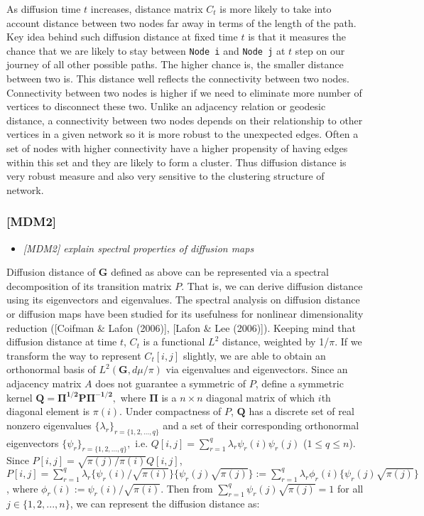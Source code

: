 \documentclass[12pt]{article}
\theoremstyle{definition}
\begin{document}
As diffusion time $t$ increases, distance matrix $C_{t}$ is more likely to take into account distance between two nodes far away in terms of the length of the path. Key idea behind such diffusion distance at fixed time $t$ is that it measures the chance that we are likely to stay between \texttt{Node i} and \texttt{Node j} at $t$ step on our journey of all other possible paths. The higher chance is, the smaller distance between two is. This distance well reflects the connectivity between two nodes. Connectivity between two nodes is higher if we need to eliminate more number of vertices to disconnect these two. Unlike an adjacency relation or geodesic distance, a connectivity between two nodes depends on their relationship to other vertices in a given network so it is more robust to the unexpected edges. Often a set of nodes with higher connectivity have a higher propensity of having edges within this set and they are likely to form a cluster. Thus diffusion distance is very robust measure and also very sensitive to the clustering structure of network. 



\subsubsection{[MDM2]}
\begin{itemize}
	\item {\it  [MDM2] explain spectral properties of diffusion maps \/}
\end{itemize}


Diffusion distance of $\boldsymbol{G}$ defined as above can be represented via a spectral decomposition of its transition matrix $P$. That is, we can derive diffusion distance using its eigenvectors and eigenvalues. The spectral analysis on diffusion distance or diffusion maps have been studied for its usefulness for nonlinear dimensionality reduction ([Coifman $\&$ Lafon (2006)], [Lafon $\&$ Lee (2006)]). 
Keeping mind that diffusion distance at time $t$, $C_{t}$ is a functional $L^2$ distance, weighted by 1/$\pi$. If we transform the way to represent $C_{t}[i,j]$ slightly, we are able to obtain an orthonormal basis of $L^{2}(\mathbf{G}, d\mu / \pi)$ via eigenvalues and eigenvectors. 
Since an adjacency matrix $A$ does not guarantee a symmetric of $P$, define a symmetric kernel $\boldsymbol{Q} = \boldsymbol{\Pi^{1/2} P \Pi^{-1/2}},$ where $\mathbf{\Pi}$ is a $n \times n$ diagonal matrix of which $i$th diagonal element is $\pi(i)$. Under compactness of $P$, $\boldsymbol{Q}$ has a discrete set of real nonzero eigenvalues $\{ \lambda_{r} \}_{r = \{1,2,...,q \}}$ and a set of their corresponding orthonormal eigenvectors $\{ \psi_{r} \}_{r = \{1,2,..., q \} },$ i.e. $Q[i,j] = \sum\limits_{r=1}^{q} \lambda_{r} \psi_{r}(i) \psi_{r}(j)$ ($1 \leq q \leq n$).  
 Since $P[i,j] = \sqrt{\pi(j) / \pi(i) } Q[i,j]$, $P[i,j]= \sum\limits_{r=1}^{q} \lambda_{r} \{ \psi_{r}(i) / \sqrt{\pi(i)}  \} \{ \psi_{r}(j) \sqrt{\pi(j)} \} := \sum\limits_{r=1}^{q} \lambda_{r} \phi_{r}(i) \{ \psi_{r}(j) \sqrt{\pi(j)} \}$, where $\phi_{r}(i) := \psi_{r}(i) / \sqrt{\pi(i)}$. Then from $\sum\limits_{r=1}^{q} \psi_{r}(j) \sqrt{\pi(j)} = 1$ for all $j \in \{1,2,...,n\}$, 
 we can represent the diffusion distance as: 
 
\end{document}
